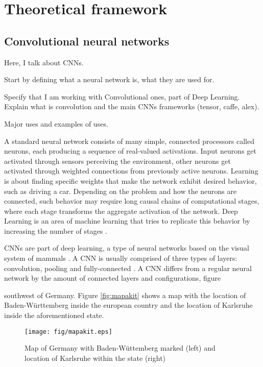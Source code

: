 \chapter{Theoretical framework}
\label{ch:marco}

\section{Convolutional neural networks}

Here, I talk about CNNs.

Start by defining what a neural network is, what they are used for.

Specify that I am working with Convolutional ones, part of Deep Learning.
Explain what is convolution and the main CNNs frameworks (tensor, caffe, alex).

Major uses and examples of uses.


A standard neural network consists of many simple, connected processors called neurons,
each producing a sequence of real-valued activations. Input neurons get activated through 
sensors perceiving the environment, other neurons get activated through weighted connections from previously
active neurons.
Learning is about finding specific weights that make the network exhibit desired behavior,
such as driving a car. Depending on the problem and how the neurons are connected, such behavior
may require long causal chains of computational stages, where each stage transforms 
the aggregate activation of the network. Deep Learning is an area of machine learning that tries to
replicate this behavior by increasing the number of stages \cite{schmidhuber2015deep}.



CNNs are part of deep learning, a type of neural networks based on the 
visual system of mammals \cite{fukushima1980neocognitron}\cite{hubel1968receptive}.
A CNN is usually comprised of three types of layers: convolution, pooling and 
fully-connected \cite{karpathy2016cs231n}. A CNN differs from a regular neural network
by the amount of connected layers and configurations, figure 

southwest of Germany. Figure \ref{fig:mapakit} shows a map with the location of Baden-Württemberg inside the european
country and the location of Karlsruhe inside the aforementioned state.

\begin{figure}
    \texttt{[image: fig/mapakit.eps]}
    \caption{Map of Germany with Baden-Wüttemberg marked (left) \cite{badenmap} and location of Karlsruhe within the state (right) \cite{karlsmap}}
    \label{fig:cnn}
\end{figure}

